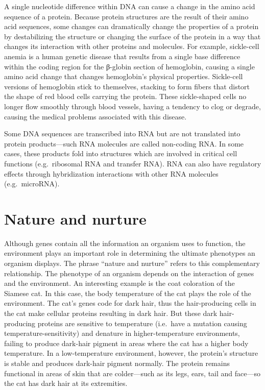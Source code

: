 A single nucleotide difference within DNA can cause a change in the amino acid sequence of a protein. Because protein structures are the result of their amino acid sequences, some changes can dramatically change the properties of a protein by destabilizing the structure or changing the surface of the protein in a way that changes its interaction with other proteins and molecules. For example, sickle-cell anemia is a human genetic disease that results from a single base difference within the coding region for the β-globin section of hemoglobin, causing a single amino acid change that changes hemoglobin's physical properties. Sickle-cell versions of hemoglobin stick to themselves, stacking to form fibers that distort the shape of red blood cells carrying the protein. These sickle-shaped cells no longer flow smoothly through blood vessels, having a tendency to clog or degrade, causing the medical problems associated with this disease.

Some DNA sequences are transcribed into RNA but are not translated into protein products---such RNA molecules are called non-coding RNA. In some cases, these products fold into structures which are involved in critical cell functions (e.g.~ribosomal RNA and transfer RNA). RNA can also have regulatory effects through hybridization interactions with other RNA molecules (e.g.~microRNA).

\hypertarget{nature-and-nurture}{%
\section{Nature and nurture}\label{nature-and-nurture}}

Although genes contain all the information an organism uses to function, the environment plays an important role in determining the ultimate phenotypes an organism displays. The phrase ``nature and nurture'' refers to this complementary relationship. The phenotype of an organism depends on the interaction of genes and the environment. An interesting example is the coat coloration of the Siamese cat. In this case, the body temperature of the cat plays the role of the environment. The cat's genes code for dark hair, thus the hair-producing cells in the cat make cellular proteins resulting in dark hair. But these dark hair-producing proteins are sensitive to temperature (i.e.~have a mutation causing temperature-sensitivity) and denature in higher-temperature environments, failing to produce dark-hair pigment in areas where the cat has a higher body temperature. In a low-temperature environment, however, the protein's structure is stable and produces dark-hair pigment normally. The protein remains functional in areas of skin that are colder---such as its legs, ears, tail and face---so the cat has dark hair at its extremities.

